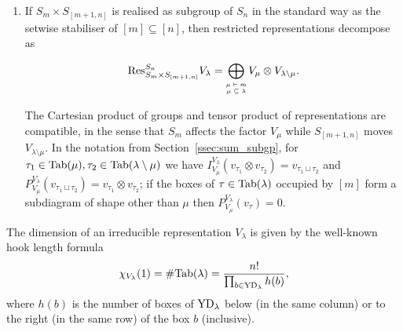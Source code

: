 \documentclass{amsart}
\newcommand{\tn}{\textnormal}
\begin{document}
\begin{enumerate}
\item If $S_m\times S_{[m+1,n]}$ is realised as subgroup of $S_n$ in the standard way as the setwise stabiliser of $[m]\subseteq[n]$, then restricted representations decompose as
\begin{minipage}{\textwidth}\begin{equation}\label{eq:branching_rule}
\tn{Res}_{S_m\times S_{[m+1,n]}}^{S_n}V_\lambda=\bigoplus_{\tiny\begin{matrix}\mu\vdash m\\\mu\subseteq\lambda\end{matrix}}V_\mu\otimes V_{\lambda\setminus\mu}.
\end{equation}\end{minipage}
The Cartesian product of groups and tensor product of representations are compatible, in the sense that $S_m$ affects the factor $V_\mu$ while $S_{[m+1,n]}$ moves $V_{\lambda\setminus\mu}$. In the notation from Section~\ref{ssec:sum_subgp}, for $\tau_1\in\tn{Tab}(\mu),\tau_2\in\tn{Tab}(\lambda\setminus\mu)$ we have $I_{V_\mu}^{V_\lambda}(v_{\tau_1}\otimes v_{\tau_2})=v_{\tau_1\sqcup\tau_2}$ and $P_{V_\mu}^{V_\lambda}(v_{\tau_1\sqcup\tau_2})=v_{\tau_1}\otimes v_{\tau_2}$; if the boxes of $\tau\in\tn{Tab}(\lambda)$ occupied by $[m]$ form a subdiagram of shape other than $\mu$ then $P_{V_\mu}^{V_\lambda}(v_\tau)=0$.
\end{enumerate}

The dimension of an irreducible representation $V_\lambda$ is given by the well-known hook length formula
\begin{equation}\label{eq:hooklen}
\chi_{V_\lambda}(1)=\#\tn{Tab}(\lambda)=\frac{n!}{\prod_{b\in\tn{YD}_\lambda}h(b)},
\end{equation}
where $h(b)$ is the number of boxes of $\tn{YD}_\lambda$ below (in the same column) or to the right (in the same row) of the box $b$ (inclusive).

\medskip
\end{document}
